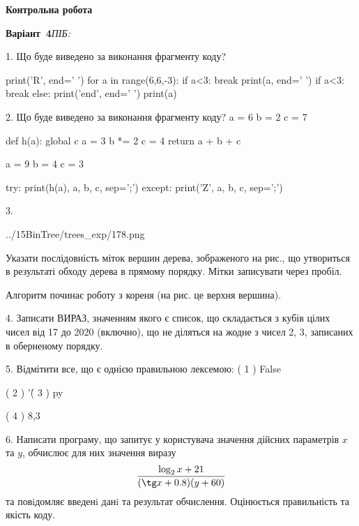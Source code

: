 \documentclass[11pt]{article}
\begin{document}
{\large\textbf{Контрольна робота}}

\textbf{Варіант \No\,4}\hfill \textit{ПІБ:}\,\underline{\hspace{60mm}}
\vspace{4mm}

1. Що буде виведено за виконання фрагменту коду?

print('R', end=' ')
for a in range(6,6,-3):
    if a<3:
        break
        print(a, end=' ')
    if a<3:
        break
    else:
        print('end', end=' ')
    print(a)
\vspace{5mm}

2. Що буде виведено за виконання фрагменту коду?
a = 6
b = 2
c = 7

def h(a):
global c    a = 3
    b *= 2
    c = 4
    return a + b + c

a = 9
b = 4
c = 3

try:
    print(h(a), a, b, c, sep=';')
except:
    print('Z', a, b, c, sep=';')
\vspace{5mm}

3. 

\begin{center}
	{../15BinTree/trees_exp/178.png}
\end{center}
Указати послідовність міток вершин дерева, зображеного на рис., що утвориться в результаті обходу дерева в прямому порядку. Мітки записувати через пробіл.\par Алгоритм починає роботу з кореня (на рис. це верхня вершина).
\vspace{5mm}

4. 
Записати ВИРАЗ, значенням якого є список, що складається з кубів цілих чисел від 17 до 2020 (включно), що не діляться на жодне з чисел 2, 3, записаних в оберненому порядку.\vspace{5mm}

5. %
Відмітити все, що є однією правильною лексемою:
( 1 ) False

( 2 ) '\'

( 3 ) py

( 4 ) 8,3
\vspace{5mm}

6. 
Написати програму, що запитує у користувача значення дійсних параметрів $x$ та $y$, обчислює для них значення виразу 
$$\frac{\log_{2} x + 21}{(\tg x + 0.8) (y + 60)}$$ 
та повiдомляє введенi данi та результат обчислення.
 Оцінюється правильність та якість коду.
\end{document}
